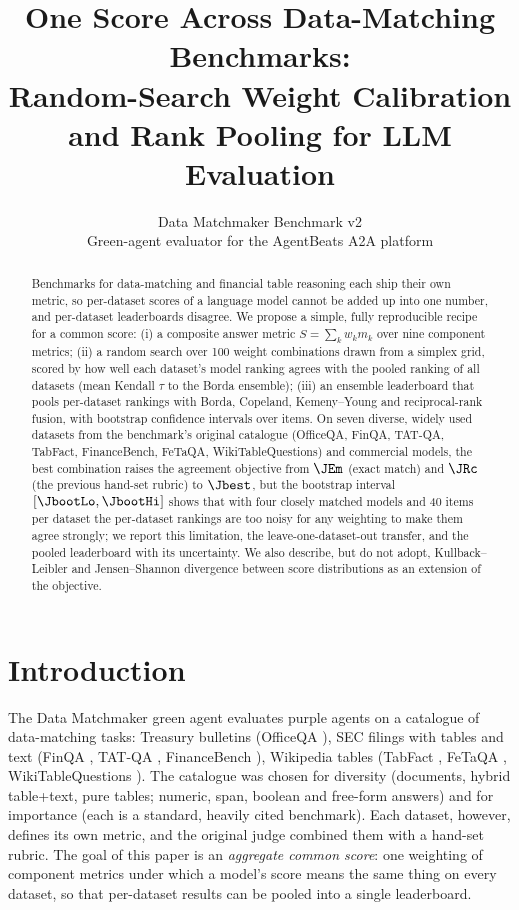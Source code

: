 \documentclass[10pt,twocolumn]{article}
\title{\textbf{One Score Across Data-Matching Benchmarks:\\Random-Search Weight Calibration and Rank Pooling for LLM Evaluation}}
\author{Data Matchmaker Benchmark v2 \\ \small Green-agent evaluator for the AgentBeats A2A platform}
\date{}
\begin{document}
\maketitle
\begin{abstract}
Benchmarks for data-matching and financial table reasoning each ship their own metric, so per-dataset scores of a language model cannot be added up into one number, and per-dataset leaderboards disagree. We propose a simple, fully reproducible recipe for a common score: (i) a composite answer metric $S=\sum_k w_k m_k$ over nine component metrics; (ii) a random search over 100 weight combinations drawn from a simplex grid, scored by how well each dataset's model ranking agrees with the pooled ranking of all datasets (mean Kendall $\tau$ to the Borda ensemble); (iii) an ensemble leaderboard that pools per-dataset rankings with Borda, Copeland, Kemeny--Young and reciprocal-rank fusion, with bootstrap confidence intervals over items. On seven diverse, widely used datasets from the benchmark's original catalogue (OfficeQA, FinQA, TAT-QA, TabFact, FinanceBench, FeTaQA, WikiTableQuestions) and \nModels{} commercial models, the best combination raises the agreement objective from $\JEm$ (exact match) and $\JRc$ (the previous hand-set rubric) to $\Jbest$, but the bootstrap interval $[\JbootLo, \JbootHi]$ shows that with four closely matched models and 40 items per dataset the per-dataset rankings are too noisy for any weighting to make them agree strongly; we report this limitation, the leave-one-dataset-out transfer, and the pooled leaderboard with its uncertainty. We also describe, but do not adopt, Kullback--Leibler and Jensen--Shannon divergence between score distributions as an extension of the objective.
\end{abstract}

\section{Introduction}
The Data Matchmaker green agent \cite{a2a2025,tpcdi2014} evaluates purple agents on a catalogue of data-matching tasks: Treasury bulletins (OfficeQA \cite{officeqa2026}), SEC filings with tables and text (FinQA \cite{chen2021finqa}, TAT-QA \cite{zhu2021tatqa}, FinanceBench \cite{islam2023financebench}), Wikipedia tables (TabFact \cite{chen2020tabfact}, FeTaQA \cite{nan2022fetaqa}, WikiTableQuestions \cite{pasupat2015wtq}). The catalogue was chosen for diversity (documents, hybrid table+text, pure tables; numeric, span, boolean and free-form answers) and for importance (each is a standard, heavily cited benchmark). Each dataset, however, defines its own metric, and the original judge combined them with a hand-set rubric. The goal of this paper is an \emph{aggregate common score}: one weighting of component metrics under which a model's score means the same thing on every dataset, so that per-dataset results can be pooled into a single leaderboard.
\end{document}
